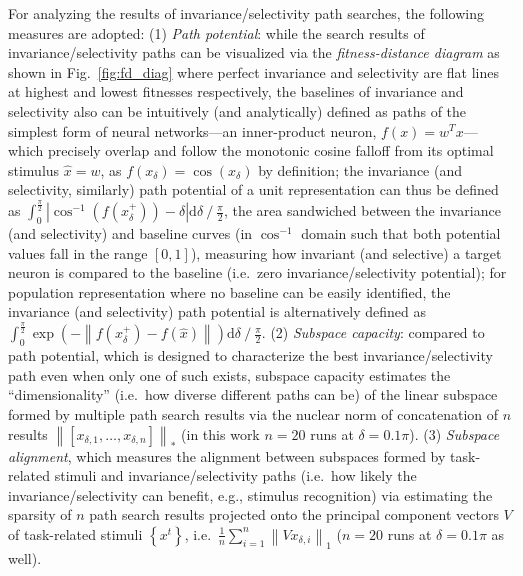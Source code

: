 For analyzing the results of invariance/selectivity path searches, the following measures are adopted: (1) \emph{Path potential}: while the search results of invariance/selectivity paths can be visualized via the \emph{fitness-distance diagram} \cite{jones1995fitness} as shown in Fig.~\ref{fig:fd_diag} where perfect invariance and selectivity are flat lines at highest and lowest fitnesses respectively, the baselines of invariance and selectivity also can be intuitively (and analytically) defined as paths of the simplest form of neural networks---an inner-product neuron, $f(x) = w^{T}x$---which precisely overlap and follow the monotonic cosine falloff from its optimal stimulus $\hat{x}=w$, as $f(x_{\delta}) = \cos(x_{\delta})$ by definition; the invariance (and selectivity, similarly) path potential of a unit representation can thus be defined as $\int_{0}^{\frac{\pi}{2}}{\left| \cos^{-1}\left(f\left( x^{+}_{\delta} \right)\right) - \delta \right|}\mathrm{d}\delta \mathbin{/} {\frac{\pi}{2}}$, the area sandwiched between the invariance (and selectivity) and baseline curves (in $\cos^{-1}$ domain such that both potential values fall in the range $\left[0,1\right]$), measuring how invariant (and selective) a target neuron is compared to the baseline (i.e.~zero invariance/selectivity potential); for population representation where no baseline can be easily identified, the invariance (and selectivity) path potential is alternatively defined as $\int_{0}^{\frac{\pi}{2}}{\exp\left(-\left\|f\left(x^{+}_{\delta}\right)-f\left(\hat{x}\right)\right\|\right)}\mathrm{d}\delta \mathbin{/} {\frac{\pi}{2}}$. (2) \emph{Subspace capacity}: compared to path potential, which is designed to characterize the best invariance/selectivity path even when only one of such exists, subspace capacity estimates the ``dimensionality'' (i.e.~how diverse different paths can be) of the linear subspace formed by multiple path search results via the nuclear norm of concatenation of $n$ results $\left\|\left[x_{\delta,1},\dots,x_{\delta,n}\right]\right\|_{*}$ (in this work $n=20$ runs at $\delta=0.1\pi$). (3) \emph{Subspace alignment}, which measures the alignment between subspaces formed by task-related stimuli and invariance/selectivity paths (i.e.~how likely the invariance/selectivity can benefit, e.g., stimulus recognition) via estimating the sparsity of $n$ path search results projected onto the principal component vectors $V$ of task-related stimuli $\left\lbrace x^{t} \right\rbrace$, i.e.~$\frac{1}{n}\sum_{i=1}^{n} \left\| Vx_{\delta,i} \right\|_{1}$ ($n=20$ runs at $\delta=0.1\pi$ as well). %

